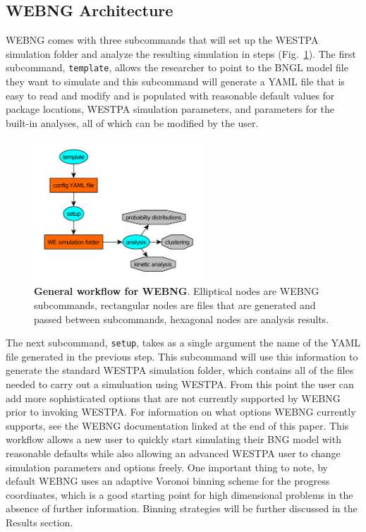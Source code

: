 \documentclass[10pt,letterpaper]{article}
\begin{document}
\subsection*{WEBNG Architecture}
WEBNG comes with three subcommands that will set up the WESTPA simulation folder and analyze the resulting simulation in steps (Fig.~\ref{fig1}). The first subcommand, \texttt{template}, allows the researcher to point to the BNGL model file they want to simulate and this subcommand will generate a YAML file that is easy to read and modify and is populated with reasonable default values for package locations, WESTPA simulation parameters, and parameters for the built-in analyses, all of which can be modified by the user.

\begin{figure}[ht] %
\centering
\includegraphics[width=2.5in]{fig1.pdf}
\caption{\color{Gray} \textbf{General workflow for WEBNG}. Elliptical nodes are WEBNG subcommands, rectangular nodes are files that are generated and passed between subcommands, hexagonal nodes are analysis results.}
\label{fig1} %
\end{figure}

The next subcommand, \texttt{setup}, takes as a single argument the name of the YAML file generated in the previous step. This subcommand will use this information to generate the standard WESTPA simulation folder, which contains all of the files needed to carry out a simuluation using WESTPA. From this point the user can add more sophisticated options that are not currently supported by WEBNG prior to invoking WESTPA. For information on what options WEBNG currently supports, see the WEBNG documentation linked at the end of this paper. This workflow allows a new user to quickly start simulating their BNG model with reasonable defaults while also allowing an advanced WESTPA user to change simulation parameters and options freely. One important thing to note, by default WEBNG uses an adaptive Voronoi binning scheme\cite{voronoi} for the progress coordinates, which is a good starting point for high dimensional problems in the absence of further information. Binning strategies will be further discussed in the Results section. 
\end{document}
